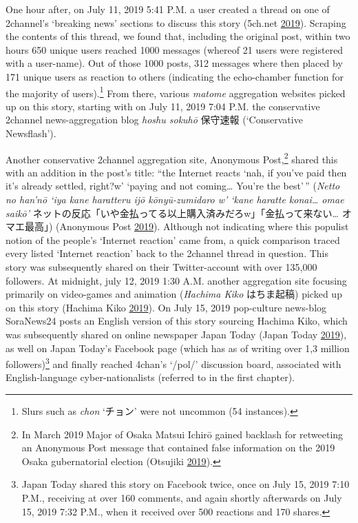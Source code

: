 \documentclass[10pt,british,A4paper,twoside]{memoir}
\begin{document}
One hour after, on July 11, 2019 5:41 P.M. a user created a thread on
one of 2channel's `breaking news' sections to discuss this story
(5ch.net \protect\hyperlink{ref-5ch.net_eng._2019}{2019}). Scraping the contents of this thread, we found that,
including the original post, within two hours 650 unique users reached
1000 messages (whereof 21 users were registered with a user-name). Out
of those 1000 posts, 312 messages where then placed by 171 unique users
as reaction to others (indicating the echo-chamber function for the
majority of users).\footnote{Slurs such as \emph{chon} `チョン' were not
  uncommon (54 instances).} From there, various \emph{matome}
aggregation websites picked up on this story, starting with on July 11,
2019 7:04 P.M. the conservative 2channel news-aggregation blog
\emph{hoshu sokuhō} 保守速報 (`Conservative Newsflash').

Another conservative 2channel aggregation site, Anonymous
Post,\footnote{In March 2019 Major of Osaka Matsui Ichirō gained
  backlash for retweeting an Anonymous Post message that contained false
  information on the 2019 Osaka gubernatorial election (Otsujiki
  \protect\hyperlink{ref-otsujiki_eng._2019}{2019}).} shared this with
an addition in the post's title: ``the Internet reacts `nah, if you've
paid then it's already settled, right?w' `paying and not coming\ldots{}
You're the best'\,'' (\emph{Netto no han'nō `iya kane haratteru ijō
kōnyū-zumidaro w' `kane haratte konai\ldots{} omae saikō'}
ネットの反応「いや金払ってる以上購入済みだろw」「金払って来ない\ldots{}
オマエ最高」) (Anonymous Post
\protect\hyperlink{ref-anonymous_post_eng._2019}{2019}). Although not
indicating where this populist notion of the people's `Internet
reaction' came from, a quick comparison traced every listed `Internet
reaction' back to the 2channel thread in question. This story was
subsequently shared on their Twitter-account with over 135,000
followers. At midnight, july 12, 2019 1:30 A.M. another aggregation site
focusing primarily on video-games and animation (\emph{Hachima Kiko}
はちま起稿) picked up on this story (Hachima Kiko
\protect\hyperlink{ref-hachima_kiko_eng:_2019}{2019}). On July 15, 2019 pop-culture news-blog SoraNews24 posts an English version of this story
sourcing Hachima Kiko, which was subsequently shared on online newspaper
Japan Today (Japan Today
\protect\hyperlink{ref-japan_today_popular_2019}{2019}), as well on 
Japan Today's Facebook page (which has as of writing over 1,3 million
followers)\footnote{Japan Today shared this story on Facebook twice,
  once on July 15, 2019 7:10 P.M., receiving at over 160 comments, and
  again shortly afterwards on July 15, 2019 7:32 P.M., when it received
  over 500 reactions and 170 shares.} and finally reached 4chan's
`/pol/' discussion board, associated with English-language
cyber-nationalists (referred to in the first chapter).
\end{document}
